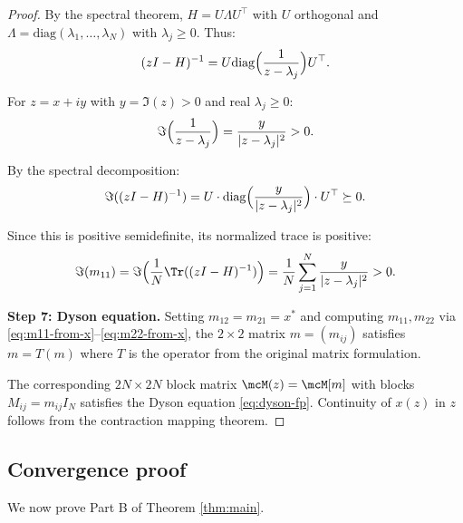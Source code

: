 \begin{proof}
By the spectral theorem, $H = U \Lambda U^\top$ with $U$ orthogonal and $\Lambda = \mathrm{diag}(\lambda_1, \ldots, \lambda_N)$ with $\lambda_j \geq 0$. Thus:
\[
(zI - H)^{-1} = U \mathrm{diag}\Bigl(\frac{1}{z - \lambda_j}\Bigr) U^\top.
\]

For $z = x + iy$ with $y = \Im(z) > 0$ and real $\lambda_j \geq 0$:
\[
\Im\Bigl(\frac{1}{z - \lambda_j}\Bigr) = \frac{y}{|z - \lambda_j|^2} > 0.
\]

By the spectral decomposition:
\[
\Im((zI - H)^{-1}) = U \cdot \mathrm{diag}\Bigl(\frac{y}{|z - \lambda_j|^2}\Bigr) \cdot U^\top \succeq 0.
\]

Since this is positive semidefinite, its normalized trace is positive:
\[
\Im(m_{11}) = \Im\Bigl(\frac{1}{N}\Tr((zI - H)^{-1})\Bigr) = \frac{1}{N}\sum_{j=1}^N \frac{y}{|z - \lambda_j|^2} > 0.
\]

\textbf{Step 7: Dyson equation.}
Setting $m_{12} = m_{21} = x^*$ and computing $m_{11}, m_{22}$ via \eqref{eq:m11-from-x}--\eqref{eq:m22-from-x}, the $2 \times 2$ matrix $m = (m_{ij})$ satisfies $m = T(m)$ where $T$ is the operator from the original matrix formulation.

The corresponding $2N \times 2N$ block matrix $\mcM(z) = \mcM[m]$ with blocks $M_{ij} = m_{ij} I_N$ satisfies the Dyson equation \eqref{eq:dyson-fp}. Continuity of $x(z)$ in $z$ follows from the contraction mapping theorem.
\end{proof}

\subsection{Convergence proof}

We now prove Part B of Theorem \ref{thm:main}.

